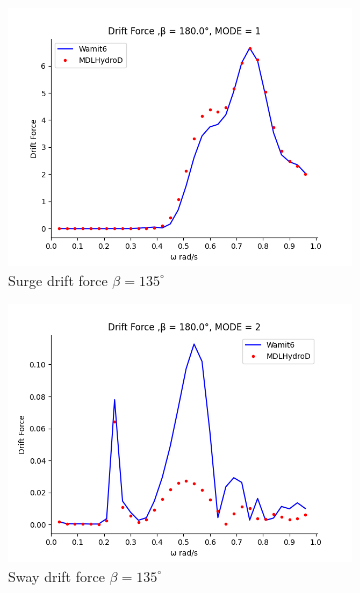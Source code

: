 \begin{figure}[H]
    \centering
    \begin{subfigure}[b]{0.45\textwidth}
        \includegraphics[width=\textwidth]{plots/kcs/drift/DrtFrc_12MODE_1.png}
        \caption{Surge drift force $\beta = 135^{\circ}$}
    \end{subfigure}
    \begin{subfigure}[b]{0.45\textwidth}
        \includegraphics[width=\textwidth]{plots/kcs/drift/DrtFrc_12MODE_2.png}
        \caption{Sway drift force $\beta = 135^{\circ}$}
    \end{subfigure}
    \vspace{5pt}%
    \begin{subfigure}[b]{0.45\textwidth}

\end{subfigure}
\end{figure}
